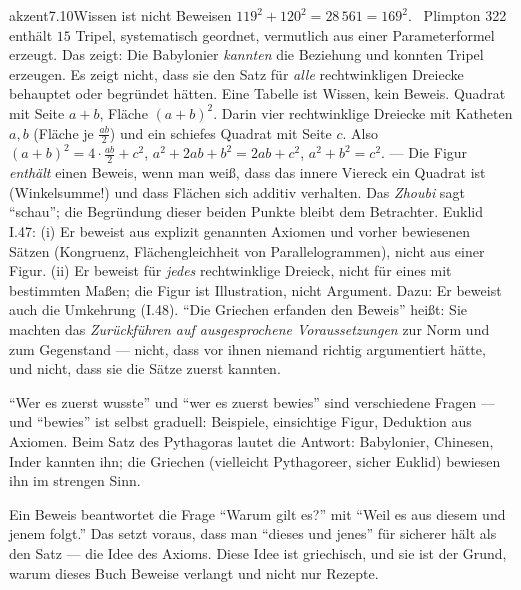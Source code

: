 \begin{loesungkarte}{akzent}{7.10}{Wissen ist nicht Beweisen}
$119^{2} + 120^{2} = 28\,561 = 169^{2}$. \checkmark\ Plimpton 322 enthält $15$ Tripel, systematisch geordnet, vermutlich aus einer Parameterformel erzeugt. Das zeigt: Die Babylonier \emph{kannten} die Beziehung und konnten Tripel erzeugen. Es zeigt nicht, dass sie den Satz für \emph{alle} rechtwinkligen Dreiecke behauptet oder begründet hätten. Eine Tabelle ist Wissen, kein Beweis.
Quadrat mit Seite $a + b$, Fläche $(a + b)^{2}$. Darin vier rechtwinklige Dreiecke mit Katheten $a, b$ (Fläche je $\frac{ab}2$) und ein schiefes Quadrat mit Seite $c$. Also $(a + b)^{2} = 4\cdot\frac{ab}2 + c^{2}$, $a^{2} + 2ab + b^{2} = 2ab + c^{2}$, $a^{2} + b^{2} = c^{2}$. --- Die Figur \emph{enthält} einen Beweis, wenn man weiß, dass das innere Viereck ein Quadrat ist (Winkelsumme!) und dass Flächen sich additiv verhalten. Das \emph{Zhoubi} sagt \enquote{schau}; die Begründung dieser beiden Punkte bleibt dem Betrachter.
Euklid I.47: (i) Er beweist aus explizit genannten Axiomen und vorher bewiesenen Sätzen (Kongruenz, Flächengleichheit von Parallelogrammen), nicht aus einer Figur. (ii) Er beweist für \emph{jedes} rechtwinklige Dreieck, nicht für eines mit bestimmten Maßen; die Figur ist Illustration, nicht Argument. Dazu: Er beweist auch die Umkehrung (I.48).
\enquote{Die Griechen erfanden den Beweis} heißt: Sie machten das \emph{Zurückführen auf ausgesprochene Voraussetzungen} zur Norm und zum Gegenstand --- nicht, dass vor ihnen niemand richtig argumentiert hätte, und nicht, dass sie die Sätze zuerst kannten.
\begin{fehler}\kastentext
\enquote{Wer es zuerst wusste} und \enquote{wer es zuerst bewies} sind verschiedene Fragen --- und \enquote{bewies} ist selbst graduell: Beispiele, einsichtige Figur, Deduktion aus Axiomen. Beim Satz des Pythagoras lautet die Antwort: Babylonier, Chinesen, Inder kannten ihn; die Griechen (vielleicht Pythagoreer, sicher Euklid) bewiesen ihn im strengen Sinn.
\end{fehler}
\begin{mitnehmen}\kastentext
Ein Beweis beantwortet die Frage \enquote{Warum gilt es?} mit \enquote{Weil es aus diesem und jenem folgt.} Das setzt voraus, dass man \enquote{dieses und jenes} für sicherer hält als den Satz --- die Idee des Axioms. Diese Idee ist griechisch, und sie ist der Grund, warum dieses Buch Beweise verlangt und nicht nur Rezepte.
\end{mitnehmen}
\end{loesungkarte}

